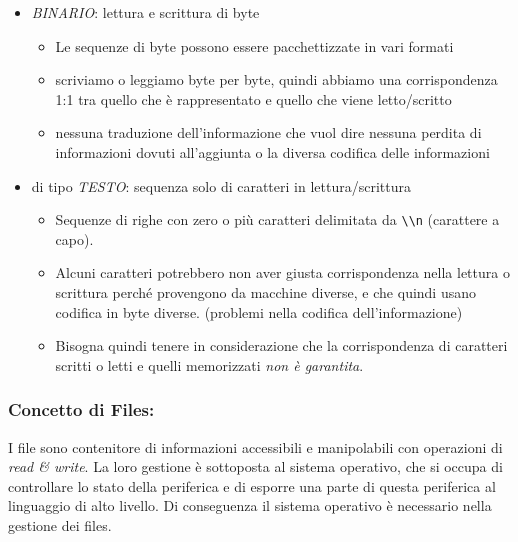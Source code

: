 \documentclass[
  paper=a4,
  oneside  ,captions=tableheading
]{scrbook}
\newcommand{\passthrough}[1]{#1}
\providecommand{\tightlist}{%
  \setlength{\itemsep}{0pt}\setlength{\parskip}{0pt}}
\begin{document}
\begin{itemize}
\tightlist
\item
  \emph{BINARIO}: lettura e scrittura di byte

  \begin{itemize}
  \tightlist
  \item
    Le sequenze di byte possono essere pacchettizzate in vari formati
  \item
    scriviamo o leggiamo byte per byte, quindi abbiamo una
    corrispondenza 1:1 tra quello che è rappresentato e quello che viene
    letto/scritto
  \item
    nessuna traduzione dell'informazione che vuol dire nessuna perdita
    di informazioni dovuti all'aggiunta o la diversa codifica delle
    informazioni
  \end{itemize}
\item
  di tipo \emph{TESTO}: sequenza solo di caratteri in lettura/scrittura

  \begin{itemize}
  \tightlist
  \item
    Sequenze di righe con zero o più caratteri delimitata da
    \passthrough{\lstinline!\\n!} (carattere a capo).
  \item
    Alcuni caratteri potrebbero non aver giusta corrispondenza nella
    lettura o scrittura perché provengono da macchine diverse, e che
    quindi usano codifica in byte diverse. (problemi nella codifica
    dell'informazione)
  \item
    Bisogna quindi tenere in considerazione che la corrispondenza di
    caratteri scritti o letti e quelli memorizzati \emph{non è
    garantita}.
  \end{itemize}
\end{itemize}

\hypertarget{concetto-di-files}{%
\subsubsection{Concetto di Files:}\label{concetto-di-files}}

I file sono contenitore di informazioni accessibili e manipolabili con
operazioni di \emph{read \& write}. La loro gestione è sottoposta al
sistema operativo, che si occupa di controllare lo stato della
periferica e di esporre una parte di questa periferica al linguaggio di
alto livello. Di conseguenza il sistema operativo è necessario nella
gestione dei files.
\end{document}
